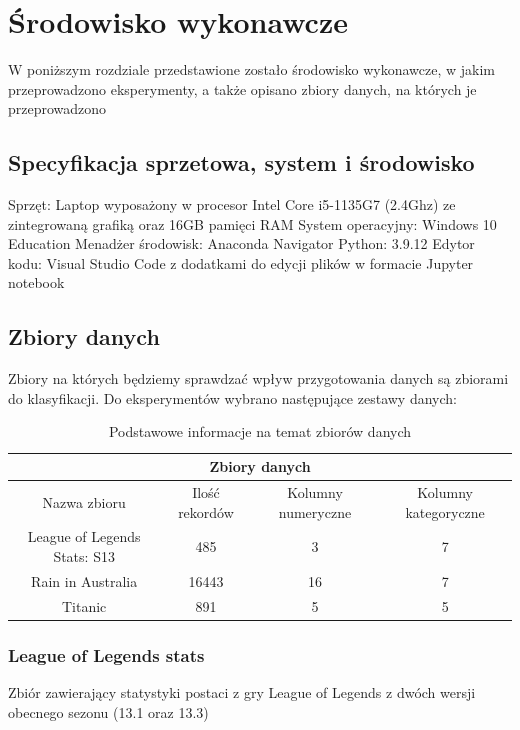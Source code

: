 \documentclass{book}
\begin{document}
\chapter{Środowisko wykonawcze}

W poniższym rozdziale przedstawione zostało środowisko wykonawcze, 
w jakim przeprowadzono eksperymenty, a także opisano zbiory danych, 
na których je przeprowadzono
\section{Specyfikacja sprzetowa, system i środowisko}
Sprzęt: Laptop wyposażony w procesor Intel Core i5-1135G7 
(2.4Ghz) ze zintegrowaną grafiką oraz 16GB pamięci RAM
System operacyjny: Windows 10 Education
Menadżer środowisk: Anaconda Navigator
Python: 3.9.12
Edytor kodu: Visual Studio Code z dodatkami do edycji plików w 
formacie Jupyter notebook
\section{Zbiory danych}
Zbiory na których będziemy sprawdzać wpływ przygotowania danych 
są zbiorami do klasyfikacji. Do eksperymentów wybrano następujące 
zestawy danych:

\begin{center}
    \begin{table}[H]
    \begin{tabular}{ |c|c|c|c| } 
    \hline
    \multicolumn{4}{|c|}{Zbiory danych} \\
    \hline
    Nazwa zbioru & Ilość rekordów & Kolumny numeryczne & Kolumny kategoryczne \\
     \hline
     League of Legends Stats: S13\cite{lol_stats_dataset} & 485 & 3 & 7\\ 
     Rain in Australia\cite{australian_rain_dataset} & 16443 & 16 & 7\\ 
     Titanic\cite{titanic_dataset} & 891 & 5 & 5\\ 
     \hline
     
    \end{tabular}
    \caption{Podstawowe informacje na temat zbiorów danych}
\end{table}
    \end{center}
\subsection{League of Legends stats}
Zbiór zawierający statystyki postaci z gry League of Legends z 
dwóch wersji obecnego sezonu (13.1 oraz 13.3)
\end{document}
